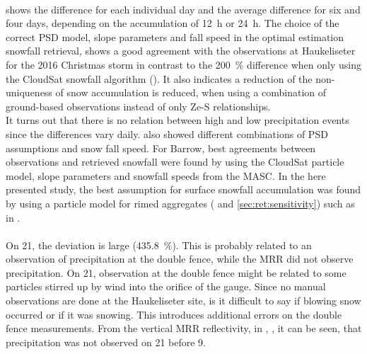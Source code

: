 \\
 shows the difference for each individual day and the average difference for six and four days, depending on the accumulation of \SI{12}{\hour} or \SI{24}{\hour}.
The choice of the correct PSD model, slope parameters and fall speed in the optimal estimation snowfall retrieval, shows a good agreement with the observations at Haukeliseter for the 2016 Christmas storm in contrast to the \SI{200}{\percent} difference when only using the CloudSat snowfall algorithm (). It also indicates a reduction of the non-uniqueness of snow accumulation is reduced, when using a combination of ground-based observations instead of only Ze-S relationships. 
\\
It turns out that there is no relation between high and low precipitation events since the differences vary daily. \citet{cooper_variational_2017} also showed different combinations of PSD assumptions and snow fall speed. For Barrow, best agreements between observations and retrieved snowfall were found by using the CloudSat particle model, slope parameters and snowfall speeds from the MASC. In the here presented study, the best assumption for surface snowfall accumulation was found by using a particle model for rimed aggregates ( and \ref{sec:ret:sensitivity}) such as in . 
\\
\\
On \SI{21}{\dec}, the deviation is large (\SI{435.8}{\percent}). This is probably related to an observation of precipitation at the double fence, while the MRR did not observe precipitation.
On \SI{21}{\dec}, observation at the double fence might be related to some particles stirred up by wind into the orifice of the gauge. Since no manual observations are done at the Haukeliseter site, is it difficult to say if blowing snow occurred or if it was snowing. This introduces additional errors on the double fence measurements. From the vertical MRR reflectivity, in , , it can be seen, that precipitation was not observed on \SI{21}{\dec} before \SI{9}{\UTC}.
